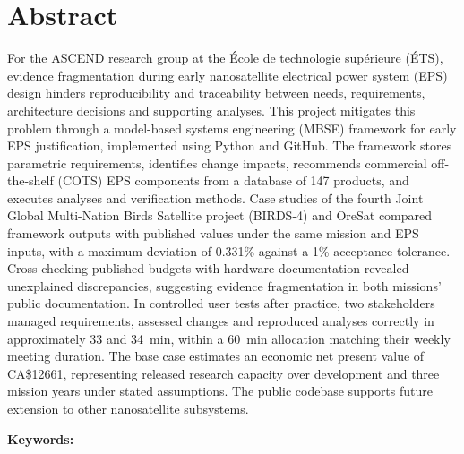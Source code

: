 \chapter*{Abstract}
\thispagestyle{empty}

For the ASCEND research group at the École de technologie supérieure (ÉTS), evidence fragmentation during early nanosatellite electrical power system (EPS) design hinders reproducibility and traceability between needs, requirements, architecture decisions and supporting analyses.
This project mitigates this problem through a model-based systems engineering (MBSE) framework for early EPS justification, implemented using Python and GitHub.
The framework stores parametric requirements, identifies change impacts, recommends commercial off-the-shelf (COTS) EPS components from a database of 147 products, and executes analyses and verification methods.
Case studies of the fourth Joint Global Multi-Nation Birds Satellite project (BIRDS-4) and OreSat compared framework outputs with published values under the same mission and EPS inputs, with a maximum deviation of 0.331\% against a 1\% acceptance tolerance.
Cross-checking published budgets with hardware documentation revealed unexplained discrepancies, suggesting evidence fragmentation in both missions' public documentation.
In controlled user tests after practice, two stakeholders managed requirements, assessed changes and reproduced analyses correctly in approximately 33 and 34~min, within a 60~min allocation matching their weekly meeting duration.
The base case estimates an economic net present value of CA\$12661, representing released research capacity over development and three mission years under stated assumptions.
The public codebase supports future extension to other nanosatellite subsystems.
\bigskip

\textbf{Keywords:} \scriptKeywords

\cleardoublepage

